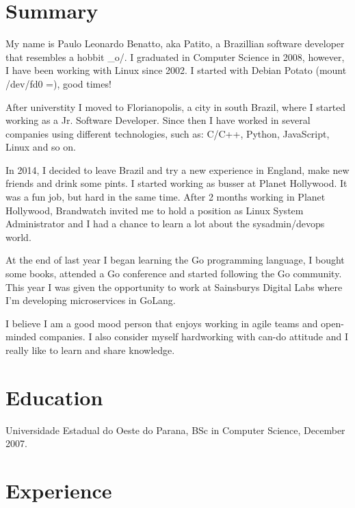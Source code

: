\documentclass[margin]{res}
\begin{document}
  

\address{Brighton, UK \\ benatto@gmail.com \\ Phone: +44 07533998484 \\ Post Code: BN21HF }
                           
                        
\begin{resume}                        
 
\section{Summary} My name is Paulo Leonardo Benatto, aka Patito, a Brazillian software developer that resembles a hobbit \_o/. I graduated in Computer Science in 2008, however, I have been working with Linux since 2002. I started with Debian Potato (mount /dev/fd0 =), good times!   

After universtity I moved to Florianopolis, a city in south Brazil, where I started working as a Jr. Software Developer. Since then I have worked in several companies using different technologies, such as: C/C++, Python, JavaScript, Linux and so on.

In 2014, I decided to leave Brazil and try a new experience in England, make new friends and drink some pints. I started working as busser at Planet Hollywood. It was a fun job, but hard in the same time. After 2 months working in Planet Hollywood, Brandwatch invited me to hold a position as Linux System Administrator and I had a chance to learn a lot about the sysadmin/devops world.

At the end of last year I began learning the Go programming language, I bought some books, attended a Go conference and started following the Go community. This year I was given the opportunity to work at Sainsburys Digital Labs where I’m developing microservices in GoLang.

I believe I am a good mood person that enjoys working in agile teams and open-minded companies. I also consider myself hardworking with can-do attitude and I really like to learn and share knowledge.
 
\section{Education}	Universidade Estadual do Oeste do Parana, BSc in Computer Science, December 2007.
  
\section{Experience}


\end{resume}
\end{document}

